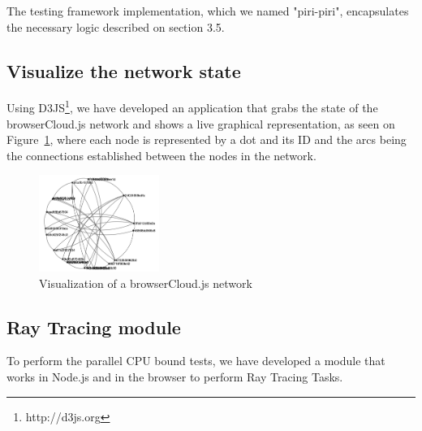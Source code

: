The testing framework implementation, which we named "piri-piri", encapsulates the necessary logic described on section 3.5.

\subsection{Visualize the network state}

Using D3JS\footnote{http://d3js.org}, we have developed an application that grabs the state of the browserCloud.js network and shows a live graphical representation, as seen on Figure~\ref{fig:visualizer}, where each node is represented by a dot and its ID and the arcs being the connections established between the nodes in the network. 

\begin{figure}[h!]
  \centering
  \includegraphics[width=0.35\textwidth]{figs/visualizer}
  \caption{Visualization of a browserCloud.js network}
  \label{fig:visualizer}
\end{figure}

\subsection{Ray Tracing module}

To perform the parallel CPU bound tests, we have developed a module that works in Node.js and in the browser to perform Ray Tracing Tasks.

